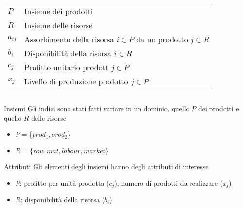 \documentclass{beamer}
\def\lyxframeend{} %
\begin{document}
\lyxframeend{}
\begin{columns}%


\begin{minipage}{\textwidth}
\footnotesize{
\begin{tabular}{lp{}}
\color{magenta}$P$		&Insieme dei prodotti\\
\color{magenta}$R$		&Insieme delle risorse\\
\color{magenta}$a_{ij}$	&Assorbimento della risorsa $i\in P$ da un prodotto $j\in R$\\
\color{magenta}$b_{i}$	&Disponibilit\`a della risorsa $i\in R$\\
\color{magenta}$c_{j}$	&Profitto unitario prodott $j\in P$\\
\color{magenta}$x_{j}$	&Livello di produzione prodotto $j\in P$
\end{tabular}
}
\end{minipage}




\end{columns}%

\lyxframeend{}
\begin{block}{Insiemi}
Gli indici sono stati fatti variare in un dominio, quello $P$ dei
prodotti e quello $R$ delle risorse

\begin{itemize}
\item $P=$\{$prod_{1},prod_{2}$\}
\item $R=\mbox{\{}row\_mat,labour,market$\}
\end{itemize}
\end{block}

\begin{block}{Attributi}
Gli elementi degli insiemi hanno degli attributi di interesse

\begin{itemize}
\item $P$: profitto per unit\`a prodotta ($c_{j}$), numero di prodotti
da realizzare ($x_{j}$)
\item $R$: disponibilit\`a della risorsa ($b_{i}$) 
\end{itemize}
\end{block}
\end{document}
